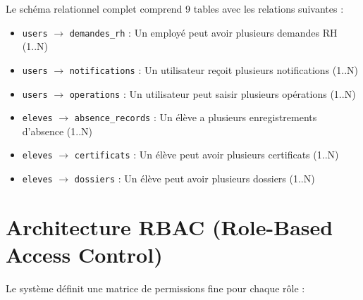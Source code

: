 \documentclass[12pt,a4paper]{report}
\begin{document}
Le schéma relationnel complet comprend 9 tables avec les relations suivantes :

\begin{itemize}
    \item \texttt{users} $\rightarrow$ \texttt{demandes\_rh} : Un employé peut avoir plusieurs demandes RH (1..N)
    \item \texttt{users} $\rightarrow$ \texttt{notifications} : Un utilisateur reçoit plusieurs notifications (1..N)
    \item \texttt{users} $\rightarrow$ \texttt{operations} : Un utilisateur peut saisir plusieurs opérations (1..N)
    \item \texttt{eleves} $\rightarrow$ \texttt{absence\_records} : Un élève a plusieurs enregistrements d'absence (1..N)
    \item \texttt{eleves} $\rightarrow$ \texttt{certificats} : Un élève peut avoir plusieurs certificats (1..N)
    \item \texttt{eleves} $\rightarrow$ \texttt{dossiers} : Un élève peut avoir plusieurs dossiers (1..N)
\end{itemize}

\section{Architecture RBAC (Role-Based Access Control)}

Le système définit une matrice de permissions fine pour chaque rôle :
\end{document}
